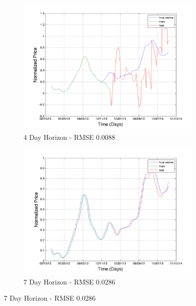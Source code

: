 \begin{figure}
        \centering
        \begin{subfigure}[b]{0.5\textwidth}
                \includegraphics[width=\textwidth]{img/model/milk/pred_4}
                \caption{4 Day Horizon - RMSE 0.0088}
                \label{fig:gull}
        \end{subfigure}%
        \begin{subfigure}[b]{0.5\textwidth}
                \includegraphics[width=\textwidth]{img/model/milk/pred_7}
                \caption{7 Day Horizon - RMSE 0.0286 }
                \label{fig:tiger}
        \end{subfigure}
       

\end{figure}
